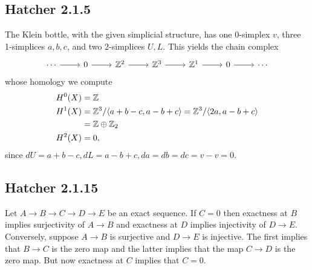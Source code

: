 \documentclass{../mathnotes}
\begin{document}
\subsection*{Hatcher 2.1.5}
The Klein bottle, with the given simplicial structure, has one 0-simplex $v$, three 1-simplices $a,b,c$,
and two 2-simplices $U,L$. This yields the chain complex
\begin{equation*}
    \begin{tikzcd}
        \cdots\ar{r} & 0\ar{r} & \Z^2\ar{r} & \Z^3\ar{r} & \Z^1\ar{r} & 0\ar{r} & \cdots
    \end{tikzcd}
\end{equation*}
whose homology we compute
\begin{align*}
    H^0(X) &= \mathbb{Z}\\
    H^1(X) &= \mathbb{Z}^3/\langle a+b-c,a-b+c\rangle=\mathbb{Z}^3/\langle2a,a-b+c\rangle\\
    &=\mathbb{Z}\oplus\mathbb{Z}_2\\
    H^2(X) &= 0,
\end{align*}
since $dU=a+b-c,dL=a-b+c,da=db=dc=v-v=0.$

\subsection*{Hatcher 2.1.15}
Let $A\to B\to C\to D\to E$ be an exact sequence. If $C=0$ then exactness at $B$ implies surjectivity
of $A\to B$ and exactness at $D$ implies injectivity of $D\to E$. Conversely, suppose $A\to B$ is surjective
and $D\to E$ is injective. The first implies that $B\to C$ is the zero map and the latter implies
that the map $C\to D$ is the zero map. But now exactness at $C$ implies that $C=0$.
\end{document}
